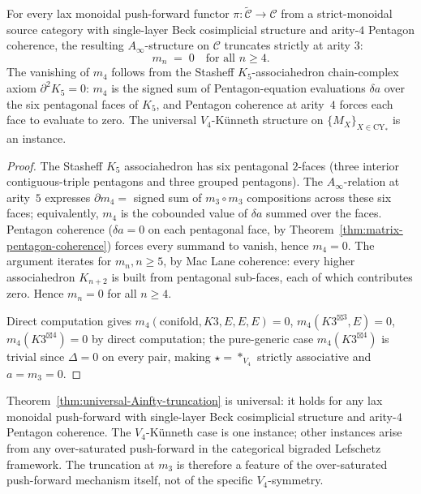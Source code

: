 \begin{theorem}
\label{thm:universal-Ainfty-truncation}
For every lax monoidal push-forward functor
$\pi: \widetilde{\mathcal{C}} \to \mathcal{C}$ from a strict-monoidal
source category with single-layer Beck cosimplicial structure and
arity-$4$ Pentagon coherence, the resulting $A_\infty$-structure on
$\mathcal{C}$ truncates strictly at arity $3$:
\[
 m_n \;=\; 0 \quad \text{for all } n \geq 4.
\]
The vanishing of $m_4$ follows from the Stasheff $K_5$-associahedron
chain-complex axiom $\partial^2 K_5 = 0$: $m_4$ is the signed sum of
Pentagon-equation evaluations $\delta a$ over the six pentagonal faces
of $K_5$, and Pentagon coherence at arity~$4$ forces each face to
evaluate to zero. The universal $V_4$-Künneth structure on
$\{M_X\}_{X \in \mathrm{CY}_*}$ is an instance.
\end{theorem}

\begin{proof}
The Stasheff $K_5$ associahedron has six pentagonal $2$-faces
\textup{(}three interior contiguous-triple pentagons and three
grouped pentagons\textup{).} The $A_\infty$-relation at arity~$5$
expresses $\partial m_4 = $ signed sum of $m_3 \circ m_3$ compositions
across these six faces; equivalently, $m_4$ is the cobounded value of
$\delta a$ summed over the faces. Pentagon coherence
\textup{(}$\delta a = 0$ on each pentagonal face, by
Theorem~\ref{thm:matrix-pentagon-coherence}\textup{)} forces every
summand to vanish, hence $m_4 = 0$. The argument iterates for
$m_n, n \geq 5$, by Mac Lane coherence: every higher associahedron
$K_{n + 2}$ is built from pentagonal sub-faces, each of which
contributes zero. Hence $m_n = 0$ for all $n \geq 4$.

Direct computation gives $m_4(\mathrm{conifold}, K3, E, E, E) = 0$,
$m_4(K3^{\boxtimes 3}, E) = 0$, $m_4(K3^{\boxtimes 4}) = 0$ by direct
computation; the pure-generic case
$m_4(K3^{\boxtimes 4})$ is trivial since $\Delta = 0$ on every pair,
making $\star = *_{V_4}$ strictly associative and $a = m_3 = 0$.
\end{proof}

\begin{remark}
\label{rem:Ainfty-truncation-universality}
Theorem~\ref{thm:universal-Ainfty-truncation} is universal: it holds
for any lax monoidal push-forward with single-layer Beck cosimplicial
structure and arity-$4$ Pentagon coherence. The $V_4$-Künneth
case is one instance; other instances arise from any over-saturated
push-forward in the categorical bigraded Lefschetz framework.
The truncation at $m_3$ is therefore a feature of the over-saturated
push-forward mechanism itself, not of the specific $V_4$-symmetry.
\end{remark}

